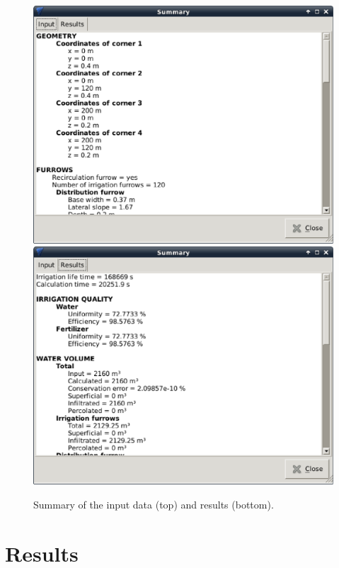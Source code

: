 \documentclass[review,authoryear]{elsarticle}
\begin{document}
\begin{figure}[!ht]
\begin{center}
\includegraphics[width=606\UNIT]{sumarioEN.eps}
\includegraphics[width=606\UNIT]{sumario2EN.eps}
\caption{Summary of the input data (top) and results (bottom).}\label{wInforme}
\end{center}
\end{figure}

\section{Results}
\end{document}
